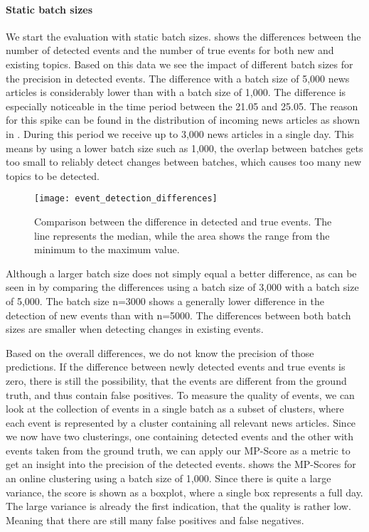 \paragraph{Static batch sizes}
We start the evaluation with static batch sizes.
 shows the differences between the number of detected events
and the number of true events for both new and existing topics.
Based on this data we see the impact of different batch sizes for the precision in detected events.
The difference with a batch size of 5,000 news articles is considerably lower than with a batch size of 1,000.
The difference is especially noticeable in the time period between the 21.05 and 25.05.
The reason for this spike can be found in the distribution of incoming news articles
as shown in .
During this period we receive up to 3,000 news articles in a single day.
This means by using a lower batch size such as 1,000,
the overlap between batches gets too small to reliably detect changes between batches,
which causes too many new topics to be detected.

\begin{figure}[h]
    \centering
    \texttt{[image: event\_detection\_differences]}
    \caption{
        Comparison between the difference in detected and true events.
        The line represents the median, while the area shows the range from the minimum to the maximum value.
    }
    \label{fig:event_detection_differences}
\end{figure}

Although a larger batch size does not simply equal a better difference,
as can be seen in 
by comparing the differences using a batch size of 3,000 with a batch size of 5,000.
The batch size n=3000 shows a generally lower difference in the detection of new events than with n=5000.
The differences between both batch sizes are smaller when detecting changes in existing events.

Based on the overall differences, we do not know the precision of those predictions.
If the difference between newly detected events and true events is zero,
there is still the possibility, that the events are different from the ground truth,
and thus contain false positives.
To measure the quality of events, we can look at the collection of events in a single batch as a subset of clusters,
where each event is represented by a cluster containing all relevant news articles.
Since we now have two clusterings, one containing detected events and the other with events taken from the ground truth,
we can apply our MP-Score as a metric to get an insight into the precision of the detected events.
 shows the MP-Scores for an online clustering using a batch size of 1,000.
Since there is quite a large variance, the score is shown as a boxplot, where a single box represents a full day.
The large variance is already the first indication, that the quality is rather low.
Meaning that there are still many false positives and false negatives.

